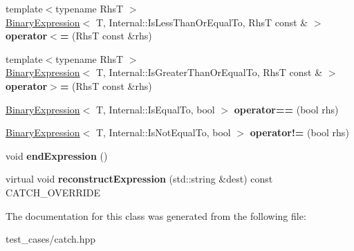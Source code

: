 \begin{DoxyCompactItemize}
\item 
\mbox{\label{classCatch_1_1ExpressionLhs_a1d10974a581c67cc400cd6cdd36b0000}} 
{\footnotesize template$<$typename RhsT $>$ }\\\hyperlink{classCatch_1_1BinaryExpression}{Binary\+Expression}$<$ T, Internal\+::\+Is\+Less\+Than\+Or\+Equal\+To, RhsT const  \& $>$ {\bfseries operator$<$=} (RhsT const \&rhs)
\item 
\mbox{\label{classCatch_1_1ExpressionLhs_a3387a494cb6b699a6c0162c79f7f533c}} 
{\footnotesize template$<$typename RhsT $>$ }\\\hyperlink{classCatch_1_1BinaryExpression}{Binary\+Expression}$<$ T, Internal\+::\+Is\+Greater\+Than\+Or\+Equal\+To, RhsT const  \& $>$ {\bfseries operator$>$=} (RhsT const \&rhs)
\item 
\mbox{\label{classCatch_1_1ExpressionLhs_ab803185079504a65b0af95f7c9669351}} 
\hyperlink{classCatch_1_1BinaryExpression}{Binary\+Expression}$<$ T, Internal\+::\+Is\+Equal\+To, bool $>$ {\bfseries operator==} (bool rhs)
\item 
\mbox{\label{classCatch_1_1ExpressionLhs_a1f3ff934880623f12a4cbd9725397ccf}} 
\hyperlink{classCatch_1_1BinaryExpression}{Binary\+Expression}$<$ T, Internal\+::\+Is\+Not\+Equal\+To, bool $>$ {\bfseries operator!=} (bool rhs)
\item 
\mbox{\label{classCatch_1_1ExpressionLhs_a13d2551a927790284fb5ddf1ee2c9079}} 
void {\bfseries end\+Expression} ()
\item 
\mbox{\label{classCatch_1_1ExpressionLhs_a7684a053e8e88a4be475a536252630da}} 
virtual void {\bfseries reconstruct\+Expression} (std\+::string \&dest) const C\+A\+T\+C\+H\+\_\+\+O\+V\+E\+R\+R\+I\+DE
\end{DoxyCompactItemize}


The documentation for this class was generated from the following file\+:\begin{DoxyCompactItemize}
\item 
test\+\_\+cases/catch.\+hpp\end{DoxyCompactItemize}
